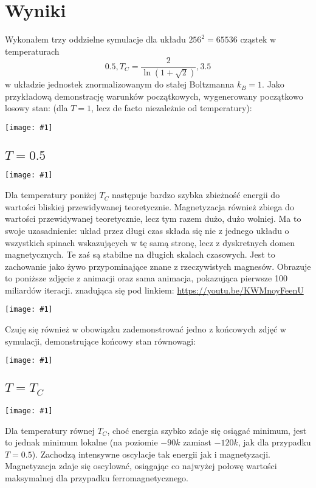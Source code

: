 \documentclass[11pt]{article}
\newcommand{\largepng}[1]{\begin{center}\texttt{[image: \#1]}\end{center}}
\begin{document}


\section{Wyniki}

Wykonałem trzy oddzielne symulacje dla układu $256^2=65 536$ cząstek w temperaturach
\[0.5, T_C = \frac{2}{\ln{(1+\sqrt{2})}}, 3.5 \]
w układzie jednostek znormalizowanym do stałej Boltzmanna $k_B = 1$.
Jako przykładową demonstrację warunków początkowych, wygenerowany początkowo losowy stan:
(dla $T=1$, lecz de facto niezależnie od temperatury):

\largepng{../data/N256_T1.0/initial.png}

\subsection{$T=0.5$}

\largepng{../data/N256_T0.5/plot.png}

Dla temperatury poniżej $T_C$ następuje bardzo szybka zbieżność energii do wartości bliskiej przewidywanej teoretycznie.
Magnetyzacja również zbiega do wartości przewidywanej teoretycznie, lecz tym razem dużo, dużo wolniej. Ma to swoje uzasadnienie:
układ przez długi czas składa się nie z jednego układu o wszystkich spinach wskazujących w tę samą stronę, lecz z dyskretnych
domen magnetycznych. Te zaś są stabilne na długich skalach czasowych. Jest to zachowanie jako żywo przypominające znane z rzeczywistych magnesów.
Obrazuje to poniższe zdjęcie z animacji oraz sama animacja, pokazująca pierwsze 100 miliardów iteracji.
znadująca się pod linkiem: \url{https://youtu.be/KWMnoyFeenU}

\largepng{../data/N256_T0.5/final.png}

Czuję się również w obowiązku zademonstrować jedno z końcowych zdjęć w symulacji, demonstrujące końcowy stan równowagi:

\largepng{../data/N256_T0.5/stabilny.png}

\subsection{$T=T_C$}
\largepng{../data/N256_T2.3/plot.png}

Dla temperatury równej $T_C$, choć energia szybko zdaje się osiągać minimum,
jest to jednak minimum lokalne (na poziomie $-90k$ zamiast $-120k$, jak dla przypadku $T=0.5$). Zachodzą intensywne
oscylacje tak energii jak i magnetyzacji. Magnetyzacja zdaje się oscylować, osiągając co najwyżej połowę wartości
maksymalnej dla przypadku ferromagnetycznego.
\end{document}

